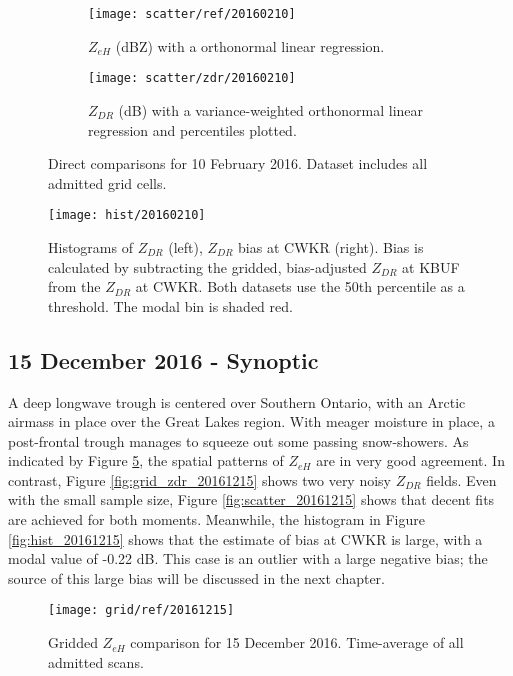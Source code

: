 \begin{figure}[H]
\centering
   \begin{subfigure}[t]{0.48\linewidth} \centering
     \texttt{[image: scatter/ref/20160210]}
     \caption{$Z_{eH}$ (dBZ) with a orthonormal linear regression.}\label{fig:scatter_ref_20160210}
   \end{subfigure}
   \begin{subfigure}[t]{0.48\linewidth} \centering
     \texttt{[image: scatter/zdr/20160210]}
     \caption{$Z_{DR}$ (dB) with a variance-weighted orthonormal linear regression and percentiles plotted.}\label{fig:scatter_zdr_20160210}
   \end{subfigure}
\caption{Direct comparisons for 10 February 2016. Dataset includes all admitted grid cells.} \label{fig:scatter_20160210}
\end{figure}

\begin{figure}[H]
\texttt{[image: hist/20160210]}\centering
\caption{Histograms of $Z_{DR}$ (left), $Z_{DR}$ bias at CWKR (right). Bias is calculated by subtracting the gridded, bias-adjusted $Z_{DR}$ at KBUF from the
$Z_{DR}$ at CWKR. Both datasets use the 50th percentile as a threshold. The modal bin is shaded red.} 
\label{fig:hist_20160210}
\end{figure}

\subsection{15 December 2016 - Synoptic}
A deep longwave trough is centered over Southern Ontario, with an Arctic airmass in place over the Great Lakes region. With meager moisture in place, a
post-frontal trough manages to squeeze out some passing snow-showers. As indicated by Figure \ref{fig:grid_ref_20161215}, the spatial patterns of $Z_{eH}$ are in very good agreement. In contrast, Figure \ref{fig:grid_zdr_20161215} shows two very noisy $Z_{DR}$ fields. Even with the small sample size, Figure \ref{fig:scatter_20161215} shows that decent fits are achieved for both moments. Meanwhile, the histogram in Figure \ref{fig:hist_20161215} shows that the estimate of bias at CWKR is large, with a modal value of -0.22 dB. This case is an outlier with a large negative bias; the source of this large bias will be discussed in the next chapter. 
\begin{figure}[p]
\texttt{[image: grid/ref/20161215]}
\caption{Gridded $Z_{eH}$ comparison for 15 December 2016. Time-average of all admitted scans.} 
\label{fig:grid_ref_20161215}
\end{figure}

